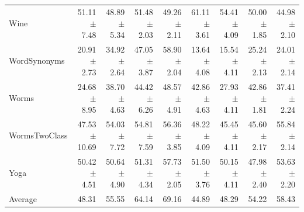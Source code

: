 \begin{landscape}
\begin{longtable}{lrrrrrrrr}
Wine & 51.11 $\pm$ 7.48 & 48.89 $\pm$ 5.34 & 51.48 $\pm$ 2.03 & 49.26 $\pm$ 2.11 & 61.11 $\pm$ 3.61 & 54.41 $\pm$ 4.09 & 50.00 $\pm$ 1.85 & 44.98 $\pm$ 2.10 \\
WordSynonyms & 20.91 $\pm$ 2.73 & 34.92 $\pm$ 2.64 & 47.05 $\pm$ 3.87 & 58.90 $\pm$ 2.04 & 13.64 $\pm$ 4.08 & 15.54 $\pm$ 4.11 & 25.24 $\pm$ 2.13 & 24.01 $\pm$ 2.14 \\
Worms & 24.68 $\pm$ 8.95 & 38.70 $\pm$ 4.63 & 44.42 $\pm$ 6.26 & 48.57 $\pm$ 4.91 & 42.86 $\pm$ 4.63 & 27.93 $\pm$ 4.11 & 42.86 $\pm$ 1.81 & 37.41 $\pm$ 2.24 \\
WormsTwoClass & 47.53 $\pm$ 10.69 & 54.03 $\pm$ 7.72 & 54.81 $\pm$ 7.59 & 56.36 $\pm$ 3.85 & 48.22 $\pm$ 4.09 & 45.45 $\pm$ 4.11 & 45.60 $\pm$ 2.17 & 55.84 $\pm$ 2.14 \\
Yoga & 50.42 $\pm$ 4.51 & 50.64 $\pm$ 4.90 & 51.31 $\pm$ 4.34 & 57.73 $\pm$ 2.05 & 51.50 $\pm$ 3.76 & 50.15 $\pm$ 4.11 & 47.98 $\pm$ 2.40 & 53.63 $\pm$ 2.20 \\
\midrule
Average & 48.31 & 55.55 & 64.14 & 69.16 & 44.89 & 48.29 & 54.22 & 58.43 \\
\bottomrule
\end{longtable}
\end{landscape}
